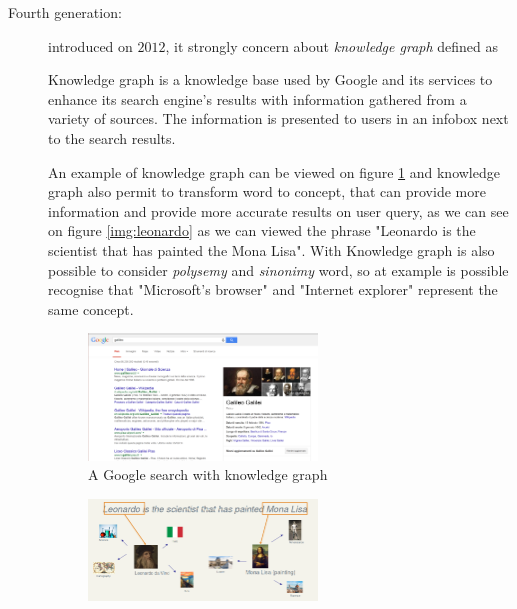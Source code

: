 \begin{description}
    \item [Fourth generation: ] introduced on $2012$, it strongly concern about \emph{knowledge graph} defined as
                                \begin{defi}
                                Knowledge graph is a knowledge base used by Google and its services to enhance
                                its search engine's results with information gathered from a variety of sources.\newline
                                The information is presented to users in an infobox next to the search results.
                                \end{defi}
                                An example of knowledge graph can be viewed on figure \ref{img:knowledgeGraph} and
                                knowledge graph also permit to transform word to concept, that can provide more
                                information and provide more accurate results on user query, as we can see on 
                                figure \ref{img:leonardo} as we can viewed the phrase "Leonardo is the scientist
                                that has painted the Mona Lisa". \newline
                                With Knowledge graph is also possible to consider \emph{polysemy} and 
                                \emph{sinonimy} word, so at example is possible recognise that "Microsoft's browser"
                                and "Internet explorer" represent the same concept.
                                \begin{figure}
                                    \includegraphics[width=0.6\textwidth]{Images/knowledgeGraph}
                                    \caption{A Google search with knowledge graph}
                                    \label{img:knowledgeGraph}
                                \end{figure}
                                \begin{figure}
                                    \includegraphics[width=0.6\textwidth]{Images/leonardo}

\end{figure}
\end{description}
